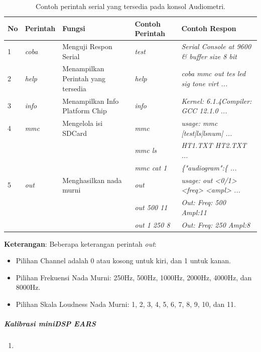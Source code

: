 \documentclass{article}
\begin{document}
	\begin{table}[!ht]
		\centering
		\begin{tabular}{|l|l|l|l|l|}
			\hline
			\textbf{No} & \textbf{Perintah} & \textbf{Fungsi} & \textbf{Contoh Perintah} & \textbf{Contoh Respon} \\
			\hline
			1 & \textit{coba} & Menguji Respon Serial & \textit{test} & \textit{Serial Console at 9600 \& buffer size 8 bit} \\
			\hline
			2 & \textit{help} & Menampilkan Perintah yang tersedia & \textit{help} & \textit{coba mmc out tes led sig tone virt ...} \\
			\hline
			3 & \textit{info} & Menampilkan Info Platform Chip & \textit{info} & \textit{Kernel: 6.1.4Compiler: GCC 12.1.0 ...} \\
			\hline
			4 & \textit{mmc} & Mengelola isi SDCard & \textit{mmc} & \textit{usage: mmc [test|ls|lsnum| ...} \\
			& & & \textit{mmc ls} & \textit{HT1.TXT HT2.TXT ...} \\
			& & & \textit{mmc cat 1} & \textit{\{"audiogram":\{ ...} \\
			\hline
			5 & \textit{out} & Menghasilkan nada murni &  \textit{out} & \textit{usage: out <0/1> <freq> <ampl> ...} \\
			& & & \textit{out 500 11} & \textit{Out: Freq:  500 Ampl:11} \\
			& & & \textit{out 1 250 8} & \textit{Out: Freq:  250 Ampl:8} \\
			\hline
		\end{tabular}
		
		\caption{Contoh perintah serial yang tersedia pada konsol Audiometri.}
	\end{table}
	
	\textbf{Keterangan}: Beberapa keterangan perintah \textit{out}:
	\begin{itemize}
		\item Pilihan Channel adalah 0 atau kosong untuk kiri, dan 1 untuk kanan.
		\item Pilihan Frekuensi Nada Murni: 250Hz, 500Hz, 1000Hz, 2000Hz, 4000Hz, dan 8000Hz.
		\item Pilihan Skala Loudness Nada Murni: 1, 2, 3, 4, 5, 6, 7, 8, 9, 10, dan 11.
	\end{itemize}
	
	\subparagraph{Kalibrasi miniDSP EARS}
		\begin{enumerate}
			\item 
		\end{enumerate}
	
\end{document}
